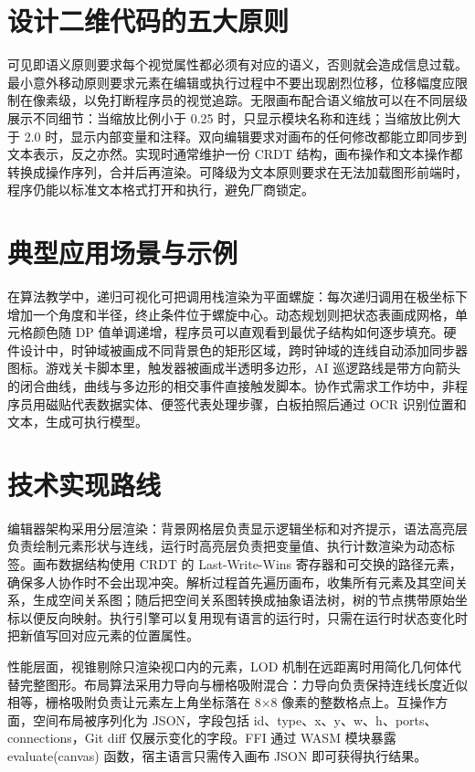 \chapter{设计二维代码的五大原则}
可见即语义原则要求每个视觉属性都必须有对应的语义，否则就会造成信息过载。最小意外移动原则要求元素在编辑或执行过程中不要出现剧烈位移，位移幅度应限制在像素级，以免打断程序员的视觉追踪。无限画布配合语义缩放可以在不同层级展示不同细节：当缩放比例小于 0.25 时，只显示模块名称和连线；当缩放比例大于 2.0 时，显示内部变量和注释。双向编辑要求对画布的任何修改都能立即同步到文本表示，反之亦然。实现时通常维护一份 CRDT 结构，画布操作和文本操作都转换成操作序列，合并后再渲染。可降级为文本原则要求在无法加载图形前端时，程序仍能以标准文本格式打开和执行，避免厂商锁定。\par
\chapter{典型应用场景与示例}
在算法教学中，递归可视化可把调用栈渲染为平面螺旋：每次递归调用在极坐标下增加一个角度和半径，终止条件位于螺旋中心。动态规划则把状态表画成网格，单元格颜色随 DP 值单调递增，程序员可以直观看到最优子结构如何逐步填充。硬件设计中，时钟域被画成不同背景色的矩形区域，跨时钟域的连线自动添加同步器图标。游戏关卡脚本里，触发器被画成半透明多边形，AI 巡逻路线是带方向箭头的闭合曲线，曲线与多边形的相交事件直接触发脚本。协作式需求工作坊中，非程序员用磁贴代表数据实体、便签代表处理步骤，白板拍照后通过 OCR 识别位置和文本，生成可执行模型。\par
\chapter{技术实现路线}
编辑器架构采用分层渲染：背景网格层负责显示逻辑坐标和对齐提示，语法高亮层负责绘制元素形状与连线，运行时高亮层负责把变量值、执行计数渲染为动态标签。画布数据结构使用 CRDT 的 Last-Write-Wins 寄存器和可交换的路径元素，确保多人协作时不会出现冲突。解析过程首先遍历画布，收集所有元素及其空间关系，生成空间关系图；随后把空间关系图转换成抽象语法树，树的节点携带原始坐标以便反向映射。执行引擎可以复用现有语言的运行时，只需在运行时状态变化时把新值写回对应元素的位置属性。\par
性能层面，视锥剔除只渲染视口内的元素，LOD 机制在远距离时用简化几何体代替完整图形。布局算法采用力导向与栅格吸附混合：力导向负责保持连线长度近似相等，栅格吸附负责让元素左上角坐标落在 8×8 像素的整数格点上。互操作方面，空间布局被序列化为 JSON，字段包括 id、type、x、y、w、h、ports、connections，Git diff 仅展示变化的字段。FFI 通过 WASM 模块暴露 evaluate(canvas) 函数，宿主语言只需传入画布 JSON 即可获得执行结果。\par
